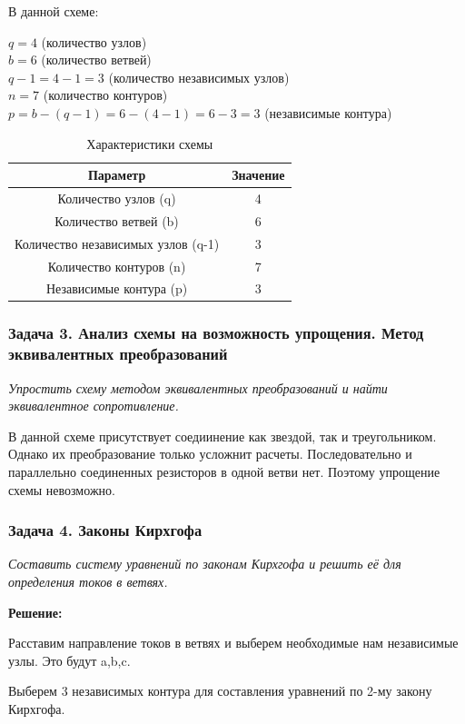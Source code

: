 В данной схеме:
\begin{flushleft}
$q = 4$ (количество узлов) \\
$b = 6$ (количество ветвей) \\
$q-1 = 4-1 = 3$ (количество независимых узлов) \\
$n = 7$ (количество контуров) \\
$p = b -(q-1) = 6-(4-1) = 6-3 = 3$ (независимые контура)
\end{flushleft}

\begin{table}[H]
\centering
\begin{tabular}{|c|c|}
\hline
\textbf{Параметр} & \textbf{Значение} \\
\hline
Количество узлов (q) & 4 \\
\hline
Количество ветвей (b) & 6 \\
\hline
Количество независимых узлов (q-1) & 3 \\
\hline
Количество контуров (n) & 7 \\
\hline
Независимые контура (p) & 3 \\
\hline
\end{tabular}
\caption{Характеристики схемы}
\label{tab:circuit_characteristics}
\end{table}


\subsubsection{Задача 3. Анализ схемы на возможность упрощения. Метод эквивалентных преобразований}
\textit{Упростить схему методом эквивалентных преобразований и найти эквивалентное сопротивление.}

В данной схеме присутствует соедиинение как звездой, так и треугольником. Однако их преобразование только усложнит расчеты. Последовательно и параллельно соединенных резисторов в одной ветви нет. Поэтому упрощение схемы невозможно.


\subsubsection{Задача 4. Законы Кирхгофа}
\textit{Составить систему уравнений по законам Кирхгофа и решить её для определения токов в ветвях.}

\textbf{Решение:}

Расставим направление токов в ветвях и выберем необходимые нам независимые узлы. Это будут a,b,c.

Выберем 3 независимых контура для составления уравнений по 2-му закону Кирхгофа.

